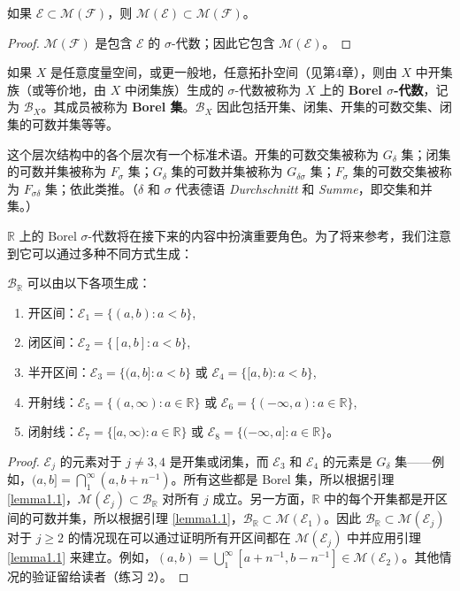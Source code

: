 \documentclass[lang=cn,10pt,thmcnt=section]{elegantbook}
\begin{document}
\begin{lemma}\label{lemma1.1}
如果 $\mathcal{E} \subset \mathcal{M}(\mathcal{F})$，则 $\mathcal{M}(\mathcal{E}) \subset \mathcal{M}(\mathcal{F})$。
\end{lemma}

\begin{proof}
$\mathcal{M}(\mathcal{F})$ 是包含 $\mathcal{E}$ 的 $\sigma$-代数；因此它包含 $\mathcal{M}(\mathcal{E})$。
\end{proof}

如果 $X$ 是任意度量空间，或更一般地，任意拓扑空间（见第4章），则由 $X$ 中开集族（或等价地，由 $X$ 中闭集族）生成的 $\sigma$-代数被称为 $X$ 上的 \textbf{Borel $\sigma$-代数}，记为 $\mathcal{B}_X$。其成员被称为 \textbf{Borel 集}。$\mathcal{B}_X$ 因此包括开集、闭集、开集的可数交集、闭集的可数并集等等。

这个层次结构中的各个层次有一个标准术语。开集的可数交集被称为 $G_\delta$ 集；闭集的可数并集被称为 $F_\sigma$ 集；$G_\delta$ 集的可数并集被称为 $G_{\delta\sigma}$ 集；$F_\sigma$ 集的可数交集被称为 $F_{\sigma\delta}$ 集；依此类推。（$\delta$ 和 $\sigma$ 代表德语 \textit{Durchschnitt} 和 \textit{Summe}，即交集和并集。）

$\mathbb{R}$ 上的 Borel $\sigma$-代数将在接下来的内容中扮演重要角色。为了将来参考，我们注意到它可以通过多种不同方式生成：

\begin{proposition}\label{proposition1.1}
$\mathcal{B}_\mathbb{R}$ 可以由以下各项生成：
\begin{enumerate}[label=\alph*.]
\item 开区间：$\mathcal{E}_1 = \{(a,b) : a < b\}$,
\item 闭区间：$\mathcal{E}_2 = \{[a,b] : a < b\}$,
\item 半开区间：$\mathcal{E}_3 = \{(a,b] : a < b\}$ 或 $\mathcal{E}_4 = \{[a,b) : a < b\}$,
\item 开射线：$\mathcal{E}_5 = \{(a,\infty) : a \in \mathbb{R}\}$ 或 $\mathcal{E}_6 = \{(-\infty,a) : a \in \mathbb{R}\}$,
\item 闭射线：$\mathcal{E}_7 = \{[a,\infty) : a \in \mathbb{R}\}$ 或 $\mathcal{E}_8 = \{(-\infty,a] : a \in \mathbb{R}\}$。
\end{enumerate}
\end{proposition}

\begin{proof}
$\mathcal{E}_j$ 的元素对于 $j \neq 3, 4$ 是开集或闭集，而 $\mathcal{E}_3$ 和 $\mathcal{E}_4$ 的元素是 $G_\delta$ 集——例如，$(a,b] = \bigcap_{1}^{\infty}(a,b+n^{-1})$。所有这些都是 Borel 集，所以根据引理 \ref{lemma1.1}，$\mathcal{M}(\mathcal{E}_j) \subset \mathcal{B}_\mathbb{R}$ 对所有 $j$ 成立。另一方面，$\mathbb{R}$ 中的每个开集都是开区间的可数并集，所以根据引理 \ref{lemma1.1}，$\mathcal{B}_\mathbb{R} \subset \mathcal{M}(\mathcal{E}_1)$。因此 $\mathcal{B}_\mathbb{R} \subset \mathcal{M}(\mathcal{E}_j)$ 对于 $j \geq 2$ 的情况现在可以通过证明所有开区间都在 $\mathcal{M}(\mathcal{E}_j)$ 中并应用引理 \ref{lemma1.1} 来建立。例如，$(a,b) = \bigcup_{1}^{\infty}[a+n^{-1}, b-n^{-1}] \in \mathcal{M}(\mathcal{E}_2)$。其他情况的验证留给读者（练习 2）。
\end{proof}
\end{document}
